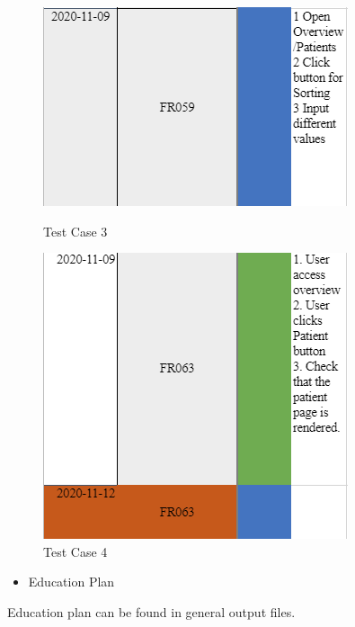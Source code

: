 \begin{figure}[ht!]
\begin{minipage}[t]{0.5\textwidth}
    \centering
    \includegraphics[scale=0.75]{Pictures/TestCase3.PNG}
    \caption{Test Case 3}
\end{minipage}%
\begin{minipage}[t]{0.5\textwidth}
    \centering
    \includegraphics[scale=0.75]{Pictures/TestCase4.PNG}
    \caption{Test Case 4}
\end{minipage}
\end{figure}

\begin{itemize}

    
    \item{Education Plan}
    \end{itemize}
    Education plan can be found in general output files.
